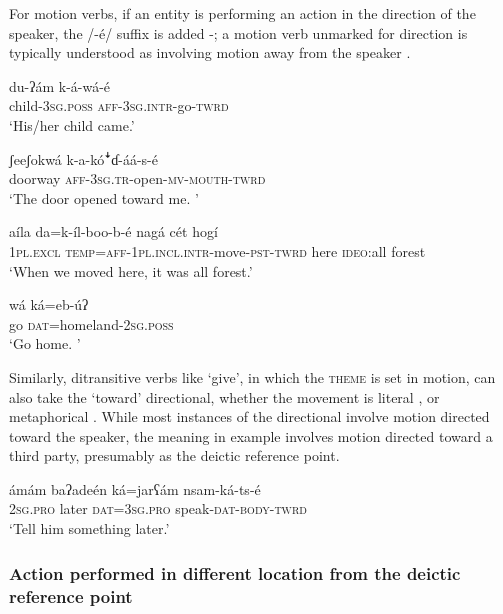 \documentclass[output=paper]{langsci/langscibook}
\begin{document}
For motion verbs, if an entity is performing an action in the direction of the speaker, the /-\'{e}/ suffix is added -; a motion verb unmarked for direction is typically understood as involving motion away from the speaker . 

\ea\label{ex:ahlandc:29}
\gll
du-ʔ\'{a}m  k-\'{a}-w\'{a}-\'{e} \\
child{}-\textsc{3sg.poss}  \textsc{aff-3sg.intr}{}-go-\textsc{twrd} \\
\glt
‘His/her child came.’
\z

\ea\label{ex:ahlandc:30}
\gll
ʃeeʃokw\'{a}  k-a-k\'{o}\textsf{ꜜ}ɗ{}-\'{a}\'{a}-s-\'{e} \\
doorway  \textsc{aff-3sg.tr}{}-open-\textsc{mv-mouth-twrd} \\ 
\glt
‘The door opened toward me. ’
\z

\ea\label{ex:ahlandc:31}
\gll
aíla  da=k-íl-boo-b-é  nagá cét  hogí \\
\textsc{1pl.excl}  \textsc{temp=aff-1pl.incl.intr}{}-move-\textsc{pst-twrd}  here  \textsc{ideo}:all  forest \\
\glt
‘When we moved here, it was all forest.’
\z

\ea\label{ex:ahlandc:32}
\gll
w\'{a} k\'{a}=eb-\'{u}ʔ  \\
go  \textsc{dat}=homeland-\textsc{2sg.poss} \\
\glt
‘Go home. ’  
\z

Similarly, ditransitive verbs like ‘give’, in which the \textsc{theme} is set in motion, can also take the ‘toward’ directional, whether the movement is literal ,  or metaphorical . While most instances of the directional involve motion directed toward the speaker, the meaning in example  involves motion directed toward a third party, presumably as the deictic reference point.

\ea\label{ex:ahlandc:33}
\gll
\'{a}m\'{a}m  baʔade\'{e}n  k\'{a}=jarʕ\'{a}m  nsam-k\'{a}-ts-\'{e}  \\
\textsc{2sg.pro}  later  \textsc{dat=3sg.pro}  speak-\textsc{dat-body-twrd} \\
\glt
‘Tell him something later.’
\z


\subsubsection{Action performed in different location from the deictic reference point}\label{sec:ahlandc:4.6.2}
\end{document}
